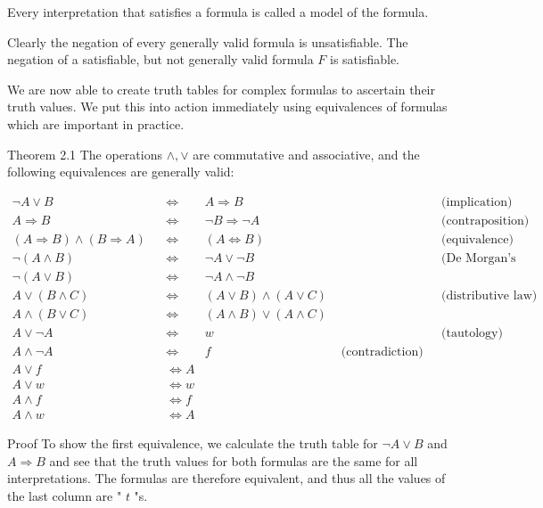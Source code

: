 \documentclass[10pt]{article}
\begin{document}
Every interpretation that satisfies a formula is called a model of the formula.

Clearly the negation of every generally valid formula is unsatisfiable. The negation of a satisfiable, but not generally valid formula $F$ is satisfiable.

We are now able to create truth tables for complex formulas to ascertain their truth values. We put this into action immediately using equivalences of formulas which are important in practice.

Theorem 2.1 The operations $\wedge, \vee$ are commutative and associative, and the following equivalences are generally valid:

$$
\begin{array}{rlrlrl}
\neg A \vee B & & \Leftrightarrow & A \Rightarrow B & & \text { (implication) } \\
A \Rightarrow B & & \Leftrightarrow & \neg B \Rightarrow \neg A & & \text { (contraposition) } \\
(A \Rightarrow B) \wedge(B \Rightarrow A) & & \Leftrightarrow & (A \Leftrightarrow B) & & \text { (equivalence) } \\
\neg(A \wedge B) & & \Leftrightarrow & \neg A \vee \neg B & & \text { (De Morgan's law) } \\
\neg(A \vee B) & & \Leftrightarrow & \neg A \wedge \neg B & & \\
A \vee(B \wedge C) & & \Leftrightarrow & (A \vee B) \wedge(A \vee C) & & \text { (distributive law) } \\
A \wedge(B \vee C) & & \Leftrightarrow & (A \wedge B) \vee(A \wedge C) & & \\
A \vee \neg A & & \Leftrightarrow & w & & \text { (tautology) } \\
A \wedge \neg A & & \Leftrightarrow & f & \text { (contradiction) } \\
A \vee f & & \Leftrightarrow A & & \\
A \vee w & & \Leftrightarrow w & & \\
A \wedge f & & \Leftrightarrow f & & \\
A \wedge w & & \Leftrightarrow A & &
\end{array}
$$

Proof To show the first equivalence, we calculate the truth table for $\neg A \vee B$ and $A \Rightarrow B$ and see that the truth values for both formulas are the same for all interpretations. The formulas are therefore equivalent, and thus all the values of the last column are " $t$ "s.
\end{document}
